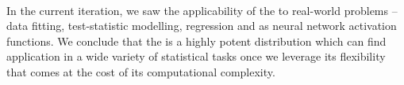 \vspace{1.5cm}
\vspace*{0.5cm}\\
In the current iteration, we saw the applicability of the \sindist{} to real-world problems -- data fitting, test-statistic modelling, regression and as neural network activation functions. We conclude that the \sindist{} is a highly potent distribution which can find application in a wide variety of statistical tasks once we leverage its flexibility that comes at the cost of its computational complexity.